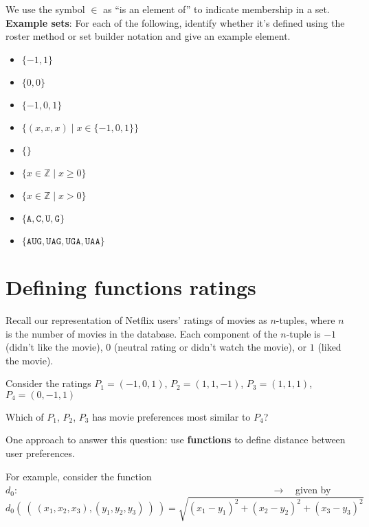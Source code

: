 \documentclass[12pt, oneside]{article}
\newcommand{\A}[0]{\texttt{A}}
\newcommand{\C}[0]{\texttt{C}}
\newcommand{\G}[0]{\texttt{G}}
\newcommand{\U}[0]{\texttt{U}}
\begin{document}
We use the symbol $\in$ as ``is an element of'' to indicate membership in a set.\\


{\bf Example sets}: For each of the following, identify whether it's defined using the roster method
or set builder notation and give an example element.
\begin{itemize}
    \item[]$\{ -1, 1\}$\\
    \item[]$\{0, 0 \}$\\
    \item[]$\{-1, 0, 1 \}$\\
    \item[]$\{(x,x,x) \mid x \in \{-1,0,1\} \}$\\
    \item[]$\{ \}$\\
    \item[]$\{ x \in \mathbb{Z} \mid x \geq 0 \}$\\
    \item[]$\{ x \in \mathbb{Z}  \mid x > 0 \}$\\
    \item[]$\{\A,\C,\U,\G\}$ \\
    \item[]$\{\A\U\G, \U\A\G, \U\G\A, \U\A\A \}$\\
\end{itemize}
 \vfill
\section*{Defining functions ratings}


Recall our representation of Netflix users' ratings of movies as $n$-tuples, where
$n$ is the number of movies in the database. 
Each component of the $n$-tuple is $-1$ (didn't like the movie), $0$ 
(neutral rating or didn't watch the movie), or $1$ (liked the movie).

Consider the ratings $P_1 = (-1, 0, 1)$, $P_2 = (1, 1, -1)$, $P_3 = (1, 1, 1)$,
$P_4 = (0,-1,1)$


Which of $P_1$, $P_2$, $P_3$ has movie preferences most similar to $P_4$?

One approach to answer this question: use {\bf functions} to define distance between user preferences.

For example, consider the function 
$d_0: \phantom{the Cartesian product of the set of ratings on 3 movies with itself} \to \phantom{\mathbb{R}}$
given by
\[
d_0 (~(~ (x_1, x_2, x_3), (y_1, y_2, y_3) ~) ~) = \sqrt{ (x_1 - y_1)^2 + (x_2 - y_2)^2 + (x_3 -y_3)^2}
\]
\end{document}
